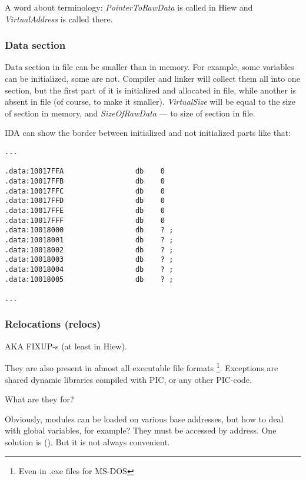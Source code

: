 A word about terminology: \emph{PointerToRawData} is called  in Hiew
and \emph{VirtualAddress} is called  there.

\subsubsection{Data section}

Data section in file can be smaller than in memory.
For example, some variables can be initialized, some are not.
Compiler and linker will collect them all into one section, but the first part of it is initialized and allocated in file,
while another is absent in file (of course, to make it smaller).
\emph{VirtualSize} will be equal to the size of section in memory, and \emph{SizeOfRawData} --- to
size of section in file.

IDA can show the border between initialized and not initialized parts like that:

\begin{lstlisting}[style=customasmx86]
...

.data:10017FFA                 db    0
.data:10017FFB                 db    0
.data:10017FFC                 db    0
.data:10017FFD                 db    0
.data:10017FFE                 db    0
.data:10017FFF                 db    0
.data:10018000                 db    ? ;
.data:10018001                 db    ? ;
.data:10018002                 db    ? ;
.data:10018003                 db    ? ;
.data:10018004                 db    ? ;
.data:10018005                 db    ? ;

...
\end{lstlisting}

\subsubsection{Relocations (relocs)}
\label{subsec:relocs}

\ac{AKA} FIXUP-s (at least in Hiew).

They are also present in almost all executable file formats
\footnote{Even in .exe files for MS-DOS}.
Exceptions are shared dynamic libraries compiled with \ac{PIC}, or any other \ac{PIC}-code.

What are they for?

Obviously, modules can be loaded on various base addresses, but how to deal with global variables, for example?
They must be accessed by address.  One solution is \PICcode{} ().
But it is not always convenient.

